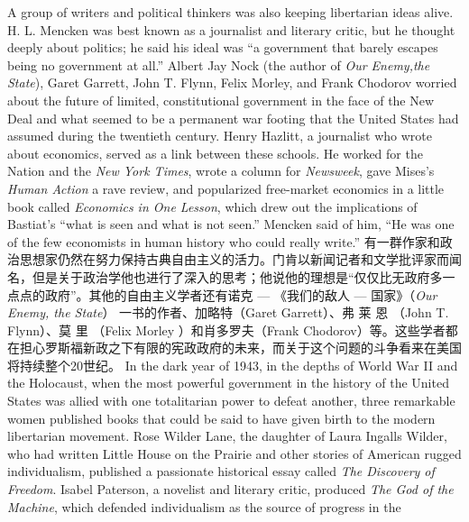 \begin{paracol}{2}
A group of writers and political thinkers was also keeping libertarian ideas alive. H. L. Mencken was best known as a journalist and literary critic, but he thought deeply about politics; he
said his ideal was ``a government that barely escapes being no
government at all.'' Albert Jay Nock (the author of \textit{Our Enemy,the State}), Garet Garrett, John T. Flynn, Felix Morley, and Frank Chodorov worried about the future of limited, constitutional
government in the face of the New Deal and what seemed to be
a permanent war footing that the United States had assumed
during the twentieth century. Henry Hazlitt, a journalist who
wrote about economics, served as a link between these schools.
He worked for the Nation and the \textit{New York Times}, wrote a column for \textit{Newsweek}, gave Mises's \textit{Human Action} a rave review, and popularized free-market economics in a little book called \textit{Economics in One Lesson}, which drew out the implications of Bastiat's
``what is seen and what is not seen.'' Mencken said of him, ``He
was one of the few economists in human history who could really write.''
\switchcolumn
有一群作家和政治思想家仍然在努力保持古典自由主义的活力。门肯以新闻记者和文学批评家而闻名，但是关于政治学他也进行了深入的思考；他说他的理想是“仅仅比无政府多一点点的政府”。其他的自由主义学者还有诺克 --- 《我们的敌人 --- 国家》（\textit{Our Enemy, the State}） 一书的作者、加略特（Garet Garrett）、弗 莱 恩 （John T. Flynn）、莫 里 （Felix  Morley ）和肖多罗夫（Frank Chodorov）等。这些学者都在担心罗斯福新政之下有限的宪政政府的未来，而关于这个问题的斗争看来在美国将持续整个20世纪。
\switchcolumn*
In the dark year of 1943, in the depths of World War II and
the Holocaust, when the most powerful government in the history of the United States was allied with one totalitarian power
to defeat another, three remarkable women published books
that could be said to have given birth to the modern libertarian
movement. Rose Wilder Lane, the daughter of Laura Ingalls
Wilder, who had written Little House on the Prairie and other stories of American rugged individualism, published a passionate
historical essay called \textit{The Discovery of Freedom}. Isabel Paterson, a
novelist and literary critic, produced \textit{The God of the Machine},
which defended individualism as the source of progress in the

\end{paracol}
